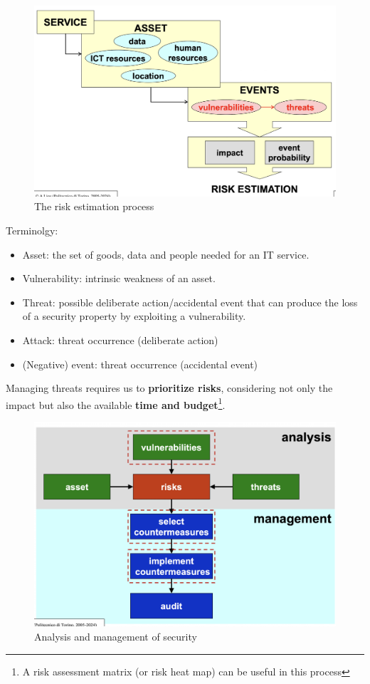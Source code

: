 \begin{figure}[H]
    \includegraphics[width=\linewidth]{Images/Introduction/riskEvaluation.png}
    \caption{The risk estimation process}
\end{figure}

Terminolgy:
\begin{itemize}
    \item Asset: the set of goods, data and people needed for an IT service.
    \item Vulnerability: intrinsic weakness of an asset.
    \item Threat: possible deliberate action/accidental event that can produce the loss of a security property by exploiting a vulnerability.
    \item Attack: threat occurrence (deliberate action)
    \item (Negative) event: threat occurrence (accidental event)
\end{itemize}

Managing threats requires us to \textbf{prioritize risks}, considering not only the impact but also the available \textbf{time and budget}\footnote{A risk assessment matrix (or risk heat map) can be useful in this process}.

\begin{figure}[H]
    \includegraphics[width=\linewidth]{Images/Introduction/analysisAndManagement.png}
    \caption{Analysis and management of security}
\end{figure}

